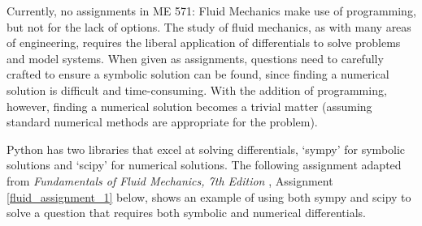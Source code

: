 Currently, no assignments in ME 571: Fluid Mechanics make use of programming, but not for
the lack of options.
The study of fluid mechanics, as with many areas of engineering, requires the liberal 
application of differentials to solve problems and model systems. When given as
assignments, questions need to carefully crafted to ensure a symbolic solution can be found,
since finding a numerical solution is difficult and time-consuming. With the addition of
programming, however, finding a numerical solution becomes a trivial matter (assuming
standard numerical methods are appropriate for the problem).

Python has two libraries that excel at solving differentials, `sympy' 
\cite{Meurer_SymPy_symbolic_computing_2017} for symbolic solutions 
and `scipy' \cite{2020SciPy-NMeth} for numerical solutions. The following assignment adapted from 
\textit{Fundamentals of Fluid Mechanics, 7th Edition} \cite{fluid-mechanics}, 
Assignment \ref{fluid_assignment_1} below, shows an example of using both sympy and scipy 
to solve a question that requires both
symbolic and numerical differentials. 

\label{fluid_assignment_1}

